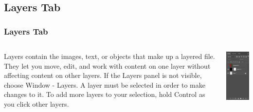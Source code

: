 \documentclass{beamer}
\begin{document}
		\subsection{Layers Tab}		
				\begin{frame}
			\frametitle{Layers Tab}
	\begin{columns}
	\vspace{-15pt}
	\begin{outline}
		\1 Layers contain the images, text, or objects that make up a layered file. 
		\2 They let you move, edit, and work with content on one layer without affecting content on other layers.
		\1 If the Layers panel is not visible, choose Window - Layers.
		\1 A layer must be selected in order to make changes to it.  
		\1 To add more layers to your selection, hold Control as you click other layers.
	\end{outline}
	\includegraphics[width=.7\textwidth]{images/layers tab.png}
\end{columns}
		\end{frame}
	
\end{document}
